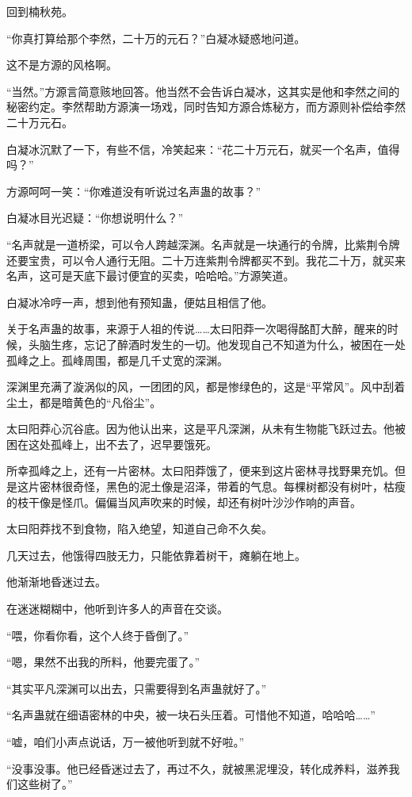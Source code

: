 \begin{this_body}
回到楠秋苑。

“你真打算给那个李然，二十万的元石？”白凝冰疑惑地问道。

这不是方源的风格啊。

“当然。”方源言简意赅地回答。他当然不会告诉白凝冰，这其实是他和李然之间的秘密约定。李然帮助方源演一场戏，同时告知方源合炼秘方，而方源则补偿给李然二十万元石。

白凝冰沉默了一下，有些不信，冷笑起来：“花二十万元石，就买一个名声，值得吗？”

方源呵呵一笑：“你难道没有听说过名声蛊的故事？”

白凝冰目光迟疑：“你想说明什么？”

“名声就是一道桥梁，可以令人跨越深渊。名声就是一块通行的令牌，比紫荆令牌还要宝贵，可以令人通行无阻。二十万连紫荆令牌都买不到。我花二十万，就买来名声，这可是天底下最讨便宜的买卖，哈哈哈。”方源笑道。

白凝冰冷哼一声，想到他有预知蛊，便姑且相信了他。

关于名声蛊的故事，来源于人祖的传说……太曰阳莽一次喝得酩酊大醉，醒来的时候，头脑生疼，忘记了醉酒时发生的一切。他发现自己不知道为什么，被困在一处孤峰之上。孤峰周围，都是几千丈宽的深渊。

深渊里充满了漩涡似的风，一团团的风，都是惨绿色的，这是“平常风”。风中刮着尘土，都是暗黄色的“凡俗尘”。

太曰阳莽心沉谷底。因为他认出来，这是平凡深渊，从未有生物能飞跃过去。他被困在这处孤峰上，出不去了，迟早要饿死。

所幸孤峰之上，还有一片密林。太曰阳莽饿了，便来到这片密林寻找野果充饥。但是这片密林很奇怪，黑色的泥土像是沼泽，带着的气息。每棵树都没有树叶，枯瘦的枝干像是怪爪。偏偏当风声吹来的时候，却还有树叶沙沙作响的声音。

太曰阳莽找不到食物，陷入绝望，知道自己命不久矣。

几天过去，他饿得四肢无力，只能依靠着树干，瘫躺在地上。

他渐渐地昏迷过去。

在迷迷糊糊中，他听到许多人的声音在交谈。

“喂，你看你看，这个人终于昏倒了。”

“嗯，果然不出我的所料，他要完蛋了。”

“其实平凡深渊可以出去，只需要得到名声蛊就好了。”

“名声蛊就在细语密林的中央，被一块石头压着。可惜他不知道，哈哈哈……”

“嘘，咱们小声点说话，万一被他听到就不好啦。”

“没事没事。他已经昏迷过去了，再过不久，就被黑泥埋没，转化成养料，滋养我们这些树了。”


\end{this_body}
